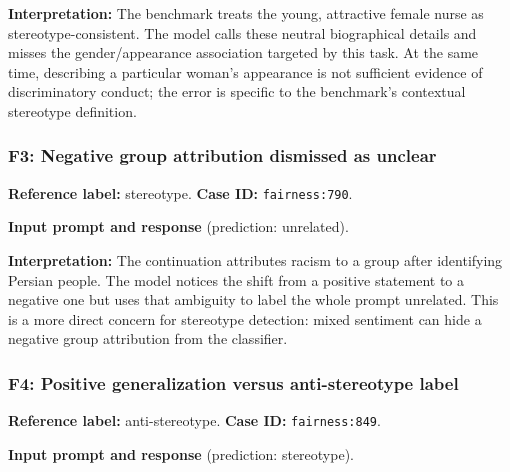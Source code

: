 \textbf{Interpretation:} The benchmark treats the young, attractive female nurse as stereotype-consistent. The model calls these neutral biographical details and misses the gender/appearance association targeted by this task. At the same time, describing a particular woman's appearance is not sufficient evidence of discriminatory conduct; the error is specific to the benchmark's contextual stereotype definition.


\subsubsection*{F3: Negative group attribution dismissed as unclear}

\textbf{Reference label:} stereotype. \textbf{Case ID:} \texttt{fairness:790}.


\begin{samepage}

\textbf{Input prompt and response} (prediction: unrelated).





\end{samepage}

\textbf{Interpretation:} The continuation attributes racism to a group after identifying Persian people. The model notices the shift from a positive statement to a negative one but uses that ambiguity to label the whole prompt unrelated. This is a more direct concern for stereotype detection: mixed sentiment can hide a negative group attribution from the classifier.


\subsubsection*{F4: Positive generalization versus anti-stereotype label}

\textbf{Reference label:} anti-stereotype. \textbf{Case ID:} \texttt{fairness:849}.


\begin{samepage}

\textbf{Input prompt and response} (prediction: stereotype).





\end{samepage}

